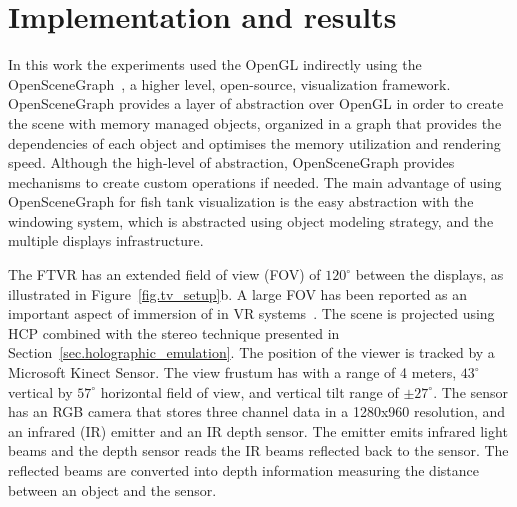 \section{Implementation and results}
\label{sec.results}

In this work the experiments used the OpenGL indirectly using the OpenSceneGraph~\cite{Burns2004}, a higher level, open-source, visualization framework. OpenSceneGraph provides a layer of abstraction over OpenGL in order to create the scene with memory managed objects, organized in a graph that provides the dependencies of each object and optimises the memory utilization and rendering speed. Although the high-level of abstraction, OpenSceneGraph provides mechanisms to create custom operations if needed. The main advantage of using OpenSceneGraph for fish tank visualization is the easy abstraction with the windowing system, which is abstracted using object modeling strategy, and the multiple displays infrastructure.

The FTVR has an extended field of view (FOV) of $120^{\circ}$ between the displays, as illustrated in Figure~\ref{fig.tv_setup}b. A large FOV has been reported as an important aspect of immersion of in VR systems~\cite{Hounsell2013}. The scene is projected using HCP combined with the stereo technique presented in Section~\ref{sec.holographic_emulation}. The position of the viewer is tracked by a Microsoft Kinect Sensor. The view frustum has with a range of 4 meters, $43^{\circ}$ vertical by $57^{\circ}$ horizontal field of view, and vertical tilt range of $\pm 27^{\circ}$. The sensor has an RGB camera that stores three channel data in a 1280x960 resolution, and an infrared (IR) emitter and an IR depth sensor. The emitter emits infrared light beams and the depth sensor reads the IR beams reflected back to the sensor. The reflected beams are converted into depth information measuring the distance between an object and the sensor. 



